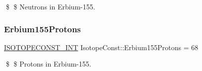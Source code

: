 \$ \$ Neutrons in Erbium-\/155. \mbox{\label{group___isotope_const-_erbium-_er155_ga6cd0a94297ede6e6f3cac04d37b50ee6}} 
\subsubsection{\texorpdfstring{Erbium155\+Protons}{Erbium155Protons}}
{\footnotesize\ttfamily \mbox{\hyperlink{group___isotope_const-_macros_ga5f18360b3e99483a35c32d789e62621c}{I\+S\+O\+T\+O\+P\+E\+C\+O\+N\+S\+T\+\_\+\+I\+NT}} Isotope\+Const\+::\+Erbium155\+Protons = 68}

\$ \$ Protons in Erbium-\/155. 